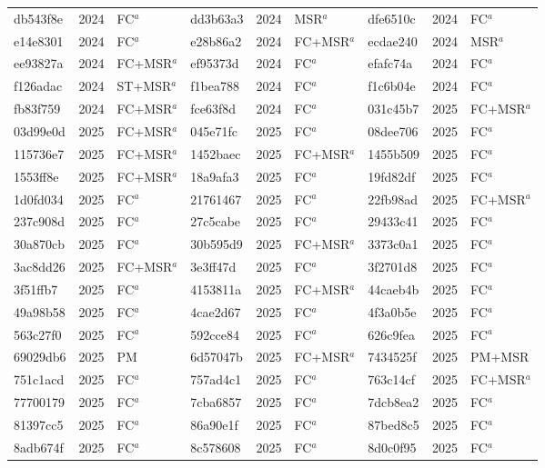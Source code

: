 \begin{longtable}{lll@{\hspace{10pt}}lll@{\hspace{10pt}}lll}
db543f8e & 2024 & FC$^{a}$ & dd3b63a3 & 2024 & MSR$^{a}$ & dfe6510c & 2024 & FC$^{a}$ \\
e14e8301 & 2024 & FC$^{a}$ & e28b86a2 & 2024 & FC+MSR$^{a}$ & ecdae240 & 2024 & MSR$^{a}$ \\
ee93827a & 2024 & FC+MSR$^{a}$ & ef95373d & 2024 & FC$^{a}$ & efafc74a & 2024 & FC$^{a}$ \\
f126adac & 2024 & ST+MSR$^{a}$ & f1bea788 & 2024 & FC$^{a}$ & f1c6b04e & 2024 & FC$^{a}$ \\
fb83f759 & 2024 & FC+MSR$^{a}$ & fce63f8d & 2024 & FC$^{a}$ & 031c45b7 & 2025 & FC+MSR$^{a}$ \\
03d99e0d & 2025 & FC+MSR$^{a}$ & 045e71fc & 2025 & FC$^{a}$ & 08dee706 & 2025 & FC$^{a}$ \\
115736e7 & 2025 & FC+MSR$^{a}$ & 1452baec & 2025 & FC+MSR$^{a}$ & 1455b509 & 2025 & FC$^{a}$ \\
1553ff8e & 2025 & FC+MSR$^{a}$ & 18a9afa3 & 2025 & FC$^{a}$ & 19fd82df & 2025 & FC$^{a}$ \\
1d0fd034 & 2025 & FC$^{a}$ & 21761467 & 2025 & FC$^{a}$ & 22fb98ad & 2025 & FC+MSR$^{a}$ \\
237c908d & 2025 & FC$^{a}$ & 27c5cabe & 2025 & FC$^{a}$ & 29433c41 & 2025 & FC$^{a}$ \\
30a870cb & 2025 & FC$^{a}$ & 30b595d9 & 2025 & FC+MSR$^{a}$ & 3373c0a1 & 2025 & FC$^{a}$ \\
3ac8dd26 & 2025 & FC+MSR$^{a}$ & 3e3ff47d & 2025 & FC$^{a}$ & 3f2701d8 & 2025 & FC$^{a}$ \\
3f51ffb7 & 2025 & FC$^{a}$ & 4153811a & 2025 & FC+MSR$^{a}$ & 44caeb4b & 2025 & FC$^{a}$ \\
49a98b58 & 2025 & FC$^{a}$ & 4cae2d67 & 2025 & FC$^{a}$ & 4f3a0b5e & 2025 & FC$^{a}$ \\
563c27f0 & 2025 & FC$^{a}$ & 592cce84 & 2025 & FC$^{a}$ & 626c9fea & 2025 & FC$^{a}$ \\
69029db6 & 2025 & PM & 6d57047b & 2025 & FC+MSR$^{a}$ & 7434525f & 2025 & PM+MSR \\
751c1acd & 2025 & FC$^{a}$ & 757ad4c1 & 2025 & FC$^{a}$ & 763c14cf & 2025 & FC+MSR$^{a}$ \\
77700179 & 2025 & FC$^{a}$ & 7cba6857 & 2025 & FC$^{a}$ & 7dcb8ea2 & 2025 & FC$^{a}$ \\
81397cc5 & 2025 & FC$^{a}$ & 86a90e1f & 2025 & FC$^{a}$ & 87bed8c5 & 2025 & FC$^{a}$ \\
8adb674f & 2025 & FC$^{a}$ & 8c578608 & 2025 & FC$^{a}$ & 8d0c0f95 & 2025 & FC$^{a}$ \\

\end{longtable}

